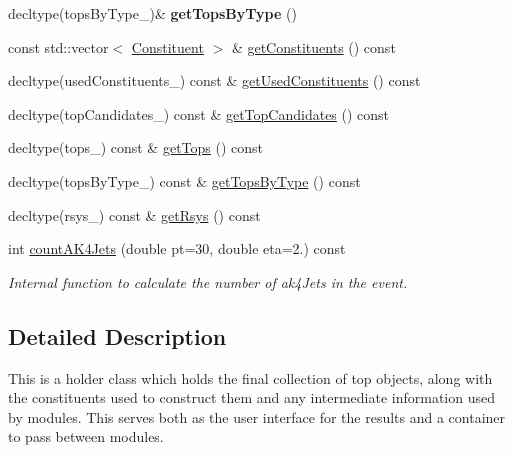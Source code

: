 \begin{DoxyCompactItemize}
\item 
\hypertarget{classTopTaggerResults_aab9cf8928f15dd99d75dee250b0324eb}{decltype(tops\-By\-Type\-\_\-)\& {\bfseries get\-Tops\-By\-Type} ()}\label{classTopTaggerResults_aab9cf8928f15dd99d75dee250b0324eb}

\item 
const std\-::vector$<$ \hyperlink{classConstituent}{Constituent} $>$ \& \hyperlink{classTopTaggerResults_ac1cf35b9f88753c844265a33954c5678}{get\-Constituents} () const 
\item 
decltype(used\-Constituents\-\_\-) const \& \hyperlink{classTopTaggerResults_a515649da0d0d2a39e1f695a384e7f1e9}{get\-Used\-Constituents} () const 
\item 
decltype(top\-Candidates\-\_\-) const \& \hyperlink{classTopTaggerResults_af73f385ccfed5d95edceff6fce6c749b}{get\-Top\-Candidates} () const 
\item 
decltype(tops\-\_\-) const \& \hyperlink{classTopTaggerResults_a247c5fe21e474217d21059d9648367c5}{get\-Tops} () const 
\item 
decltype(tops\-By\-Type\-\_\-) const \& \hyperlink{classTopTaggerResults_ac3e5eb22c271a27aed0aaab94dacb547}{get\-Tops\-By\-Type} () const 
\item 
decltype(rsys\-\_\-) const \& \hyperlink{classTopTaggerResults_a9618cf005aa6b206e70462ceeea5f6c4}{get\-Rsys} () const 
\item 
\hypertarget{classTopTaggerResults_aa7bebc069e37c004c27239c130f4a101}{int \hyperlink{classTopTaggerResults_aa7bebc069e37c004c27239c130f4a101}{count\-A\-K4\-Jets} (double pt=30, double eta=2.) const }\label{classTopTaggerResults_aa7bebc069e37c004c27239c130f4a101}

\begin{DoxyCompactList}\small\item\em Internal function to calculate the number of ak4\-Jets in the event. \end{DoxyCompactList}\end{DoxyCompactItemize}


\subsection{Detailed Description}
This is a holder class which holds the final collection of top objects, along with the constituents used to construct them and any intermediate information used by modules. This serves both as the user interface for the results and a container to pass between modules. 


